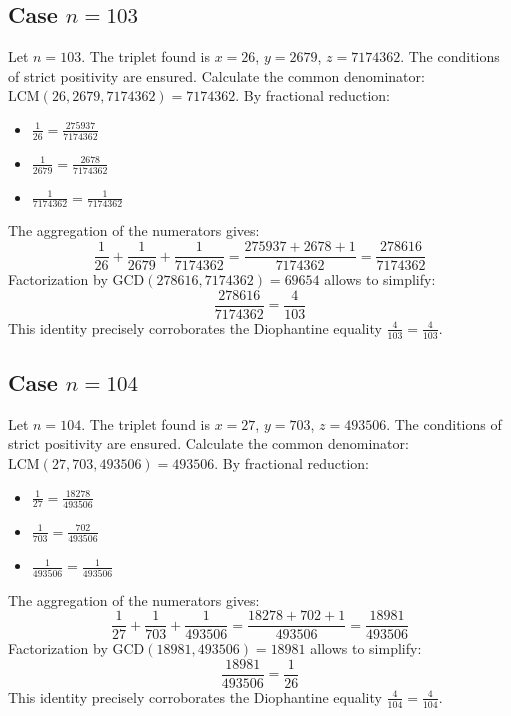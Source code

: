\documentclass[11pt,a4paper]{article}
\begin{document}
\subsection{Case $n = 103$}
Let $n = 103$. The triplet found is $x = 26$, $y = 2679$, $z = 7174362$.
The conditions of strict positivity are ensured.
Calculate the common denominator: $\text{LCM}(26, 2679, 7174362) = 7174362$.
By fractional reduction:
\begin{itemize}
    \item $\frac{1}{26} = \frac{275937}{7174362}$
    \item $\frac{1}{2679} = \frac{2678}{7174362}$
    \item $\frac{1}{7174362} = \frac{1}{7174362}$
\end{itemize}
The aggregation of the numerators gives:
$$ \frac{1}{26} + \frac{1}{2679} + \frac{1}{7174362} = \frac{275937 + 2678 + 1}{7174362} = \frac{278616}{7174362} $$
Factorization by $\text{GCD}(278616, 7174362) = 69654$ allows to simplify:
$$ \frac{278616}{7174362} = \frac{4}{103} $$
This identity precisely corroborates the Diophantine equality $\frac{4}{103} = \frac{4}{103}$.

\subsection{Case $n = 104$}
Let $n = 104$. The triplet found is $x = 27$, $y = 703$, $z = 493506$.
The conditions of strict positivity are ensured.
Calculate the common denominator: $\text{LCM}(27, 703, 493506) = 493506$.
By fractional reduction:
\begin{itemize}
    \item $\frac{1}{27} = \frac{18278}{493506}$
    \item $\frac{1}{703} = \frac{702}{493506}$
    \item $\frac{1}{493506} = \frac{1}{493506}$
\end{itemize}
The aggregation of the numerators gives:
$$ \frac{1}{27} + \frac{1}{703} + \frac{1}{493506} = \frac{18278 + 702 + 1}{493506} = \frac{18981}{493506} $$
Factorization by $\text{GCD}(18981, 493506) = 18981$ allows to simplify:
$$ \frac{18981}{493506} = \frac{1}{26} $$
This identity precisely corroborates the Diophantine equality $\frac{4}{104} = \frac{4}{104}$.
\end{document}

